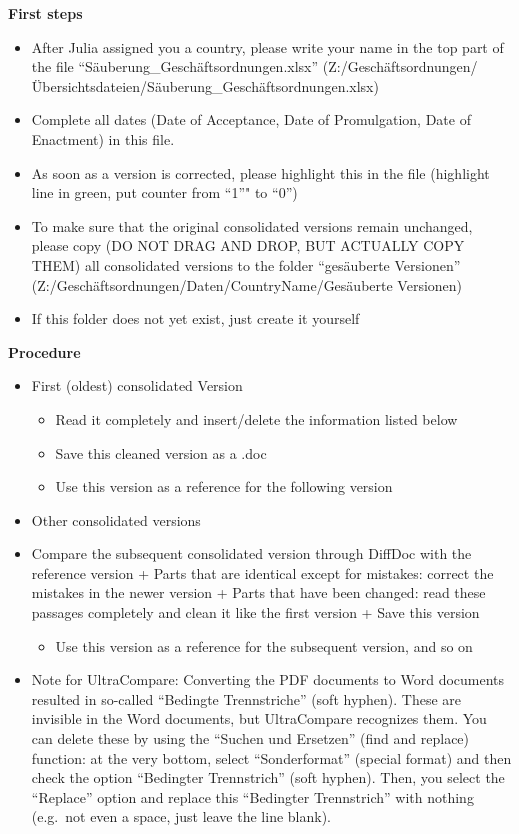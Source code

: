 \documentclass[10pt,]{article}
\providecommand{\tightlist}{%
  \setlength{\itemsep}{0pt}\setlength{\parskip}{0pt}}
\begin{document}
\textbf{First steps}

\begin{itemize}
\tightlist
\item
  After Julia assigned you a country, please write your name in the top
  part of the file ``Säuberung\_Geschäftsordnungen.xlsx''
  (Z:/Geschäftsordnungen/Übersichtsdateien/Säuberung\_Geschäftsordnungen.xlsx)
\item
  Complete all dates (Date of Acceptance, Date of Promulgation, Date of
  Enactment) in this file.
\item
  As soon as a version is corrected, please highlight this in the file
  (highlight line in green, put counter from ``1''" to ``0'')
\item
  To make sure that the original consolidated versions remain unchanged,
  please copy (DO NOT DRAG AND DROP, BUT ACTUALLY COPY THEM) all
  consolidated versions to the folder ``gesäuberte Versionen''
  (Z:/Geschäftsordnungen/Daten/CountryName/Gesäuberte Versionen)
\item
  If this folder does not yet exist, just create it yourself
\end{itemize}

\textbf{Procedure}

\begin{itemize}
\tightlist
\item
  First (oldest) consolidated Version

  \begin{itemize}
  \tightlist
  \item
    Read it completely and insert/delete the information listed below
  \item
    Save this cleaned version as a .doc
  \item
    Use this version as a reference for the following version
  \end{itemize}
\item
  Other consolidated versions
\item
  Compare the subsequent consolidated version through DiffDoc with the
  reference version + Parts that are identical except for mistakes:
  correct the mistakes in the newer version + Parts that have been
  changed: read these passages completely and clean it like the first
  version + Save this version

  \begin{itemize}
  \tightlist
  \item
    Use this version as a reference for the subsequent version, and so
    on
  \end{itemize}
\item
  Note for UltraCompare: Converting the PDF documents to Word documents
  resulted in so-called ``Bedingte Trennstriche'' (soft hyphen). These
  are invisible in the Word documents, but UltraCompare recognizes them.
  You can delete these by using the ``Suchen und Ersetzen'' (find and
  replace) function: at the very bottom, select ``Sonderformat''
  (special format) and then check the option ``Bedingter Trennstrich''
  (soft hyphen). Then, you select the ``Replace'' option and replace
  this ``Bedingter Trennstrich'' with nothing (e.g.~not even a space,
  just leave the line blank).
\end{itemize}
\end{document}
